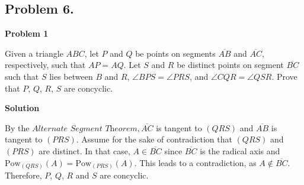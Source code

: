 \documentclass[12pt]{article}
\begin{document}
   \subsection{Problem 6.}
   \clearpage

  {\centering \textbf{Problem 1} \par}

  Given a triangle $ABC$, let $P$ and $Q$ be points on segments $\overline{AB}$ and $\overline{AC}$,
  respectively, such that $AP = AQ$. Let $S$ and $R$ be distinct points on segment $\overline{BC}$
  such that $S$ lies between $B$ and $R$, $\angle BPS = \angle PRS$, and $\angle CQR = \angle QSR$.
  Prove that $P$, $Q$, $R$, $S$ are concyclic.

  {\centering \textbf{Solution} \par}

  By the $\textit{Alternate Segment Theorem}, \overline{AC}$ is tangent to $(QRS)$ and $\overline{AB}$
  is tangent to $(PRS)$. Assume for the sake of contradiction that $(QRS)$ and $(PRS)$ are distinct. In that case,
  $A \in \overline{BC}$ since $\overline{BC}$ is the radical axis and $\text{Pow}_{(QRS)}(A) =
  \text{Pow}_{(PRS)}(A)$. This leads to a contradiction, as $A \notin \overline{BC}$. Therefore,
  $P$, $Q$, $R$ and $S$ are concyclic.
\end{document}

